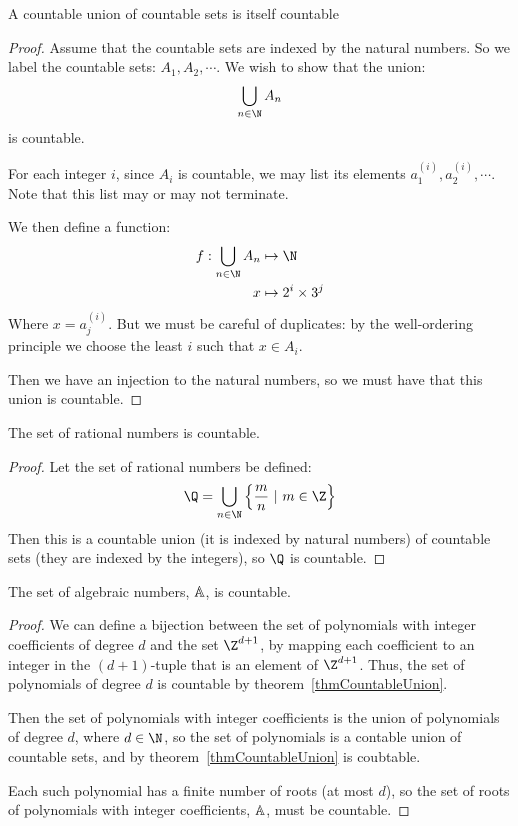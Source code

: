 \documentclass[../Main.tex]{subfiles}
\begin{document}
\begin{theorem}
    A countable union of countable sets is itself countable
    \label{thmCountableUnion}
\end{theorem}
\begin{proof}
    Assume that the countable sets are indexed by the natural numbers. So we label the countable sets: $A_1, A_2, \cdots$. We wish to show that the union: 
    \begin{equation*}
        \bigcup_{n \in \N} A_n
    \end{equation*}
    is countable.\par
    For each integer $i$, since $A_i$ is countable, we may list its elements $a_1^{(i)}, a_2^{(i)}, \cdots$. Note that this list may or may not terminate.\par
    We then define a function:
    \begin{align*}
        f: \bigcup_{n\in\N} A_n &\mapsto \N \\
        x &\mapsto 2^i \times 3^j
    \end{align*}
    Where $x = a_j^{(i)}$. But we must be careful of duplicates: by the well-ordering principle we choose the least $i$ such that $x \in A_i$.\par
    Then we have an injection to the natural numbers, so we must have that this union is countable.
\end{proof}
\begin{corollary}
    \label{corQCountable}
    The set of rational numbers is countable.
\end{corollary}
\begin{proof}
    Let the set of rational numbers be defined:
    \begin{equation*}
        \Q = \bigcup_{n \in \N} \left\{\frac{m}{n}~|~m \in \Z\right\}
    \end{equation*}
    Then this is a countable union (it is indexed by natural numbers) of countable sets (they are indexed by the integers), so $\Q$ is countable.
\end{proof}
\begin{theorem}
    \label{thmAlgebraicCountable}
    The set of algebraic numbers, $\mathbb{A}$, is countable.
\end{theorem}
\begin{proof}
    We can define a bijection between the set of polynomials with integer coefficients of degree $d$ and the set $\Z^{d+1}$, by mapping each coefficient to an integer in the $(d+1)$-tuple that is an element of $\Z^{d+1}$. Thus, the set of polynomials of degree $d$ is countable by theorem~\ref{thmCountableUnion}.\par
    Then the set of polynomials with integer coefficients is the union of polynomials of degree $d$, where $d \in \N$, so the set of polynomials is a contable union of countable sets, and by theorem~\ref{thmCountableUnion} is coubtable.\par
    Each such polynomial has a finite number of roots (at most $d$), so the set of roots of polynomials with integer coefficients, $\mathbb{A}$, must be countable.
\end{proof}
\end{document}
